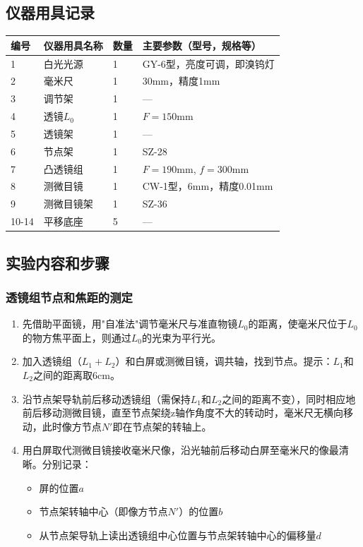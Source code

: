 \documentclass[dvipsnames, svgnames,a4paper,11pt]{article}
\begin{document}

\subsection{仪器用具记录}
\begin{table}[htbp]
	\centering
	\renewcommand\arraystretch{1.6}
	\begin{tabular}{p{}|p{}|p{}|p{}}
	\hline
	编号& 仪器用具名称 & 数量 &  主要参数（型号，规格等） \\
	\hline
	1 & 白光光源 & 1 & GY-6型，亮度可调，即溴钨灯 \\
	2 & 毫米尺 & 1 & 30mm，精度1mm \\
	3 & 调节架 & 1 & --- \\
	4 & 透镜$L_0$ & 1 & $F=150$mm \\
	5 & 透镜架 & 1 & --- \\
	6 & 节点架 & 1 & SZ-28 \\
	7 & 凸透镜组 & 1 & $F=190$mm, $f=300$mm \\
	8 & 测微目镜 & 1 & CW-1型，6mm，精度0.01mm \\
	9 & 测微目镜架 & 1 & SZ-36 \\
	10-14 & 平移底座 & 5 & --- \\
	\hline
	\end{tabular}
\end{table}



\subsection{实验内容和步骤}

\subsubsection{透镜组节点和焦距的测定}

\begin{enumerate}
	\item 先借助平面镜，用"自准法"调节毫米尺与准直物镜$L_0$的距离，使毫米尺位于$L_0$的物方焦平面上，则通过$L_0$的光束为平行光。
	
	\item 加入透镜组（$L_1+L_2$）和白屏或测微目镜，调共轴，找到节点。提示：$L_1$和$L_2$之间的距离取6cm。
	
	\item 沿节点架导轨前后移动透镜组（需保持$L_1$和$L_2$之间的距离不变），同时相应地前后移动测微目镜，直至节点架绕z轴作角度不大的转动时，毫米尺无横向移动，此时像方节点$N'$即在节点架的转轴上。
	
	\item 用白屏取代测微目镜接收毫米尺像，沿光轴前后移动白屏至毫米尺的像最清晰。分别记录：
	\begin{itemize}
		\item 屏的位置$a$
		\item 节点架转轴中心（即像方节点$N'$）的位置$b$
		\item 从节点架导轨上读出透镜组中心位置与节点架转轴中心的偏移量$d$
	\end{itemize}
\end{enumerate}
\end{document}
